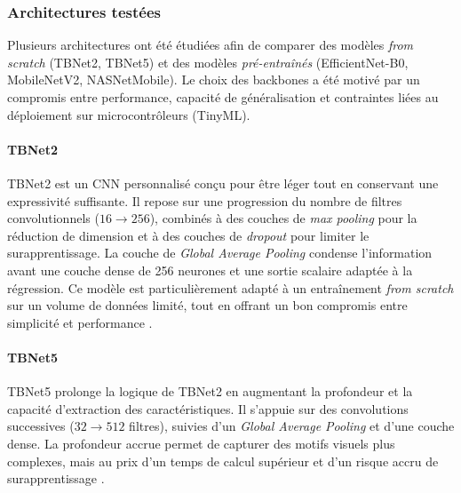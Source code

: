 \subsubsection{Architectures testées}

Plusieurs architectures ont été étudiées afin de comparer des modèles \emph{from scratch} (TBNet2, TBNet5) et des modèles \emph{pré-entraînés} (EfficientNet-B0, MobileNetV2, NASNetMobile).  
Le choix des backbones a été motivé par un compromis entre performance, capacité de généralisation et contraintes liées au déploiement sur microcontrôleurs (TinyML).

\paragraph{TBNet2}
TBNet2 est un CNN personnalisé conçu pour être léger tout en conservant une expressivité suffisante.  
Il repose sur une progression du nombre de filtres convolutionnels (\(16 \to 256\)), combinés à des couches de \textit{max pooling} pour la réduction de dimension et à des couches de \textit{dropout} pour limiter le surapprentissage.  
La couche de \textit{Global Average Pooling} condense l’information avant une couche dense de 256 neurones et une sortie scalaire adaptée à la régression.  
Ce modèle est particulièrement adapté à un entraînement \emph{from scratch} sur un volume de données limité, tout en offrant un bon compromis entre simplicité et performance \cite{lecun1998gradient}.

\paragraph{TBNet5}
TBNet5 prolonge la logique de TBNet2 en augmentant la profondeur et la capacité d’extraction des caractéristiques.  
Il s’appuie sur des convolutions successives (\(32 \to 512\) filtres), suivies d’un \textit{Global Average Pooling} et d’une couche dense.  
La profondeur accrue permet de capturer des motifs visuels plus complexes, mais au prix d’un temps de calcul supérieur et d’un risque accru de surapprentissage \cite{goodfellow2016deep}.

